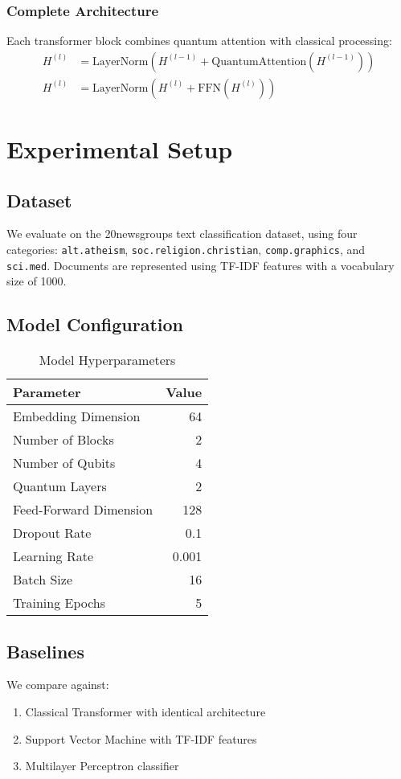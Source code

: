 \documentclass[11pt,twocolumn]{article}
\begin{document}
\subsubsection{Complete Architecture}
Each transformer block combines quantum attention with classical processing:
\begin{align}
H^{(l)} &= \text{LayerNorm}(H^{(l-1)} + \text{QuantumAttention}(H^{(l-1)}))\\
H^{(l)} &= \text{LayerNorm}(H^{(l)} + \text{FFN}(H^{(l)}))
\end{align}

\section{Experimental Setup}

\subsection{Dataset}
We evaluate on the 20newsgroups text classification dataset, using four categories: \texttt{alt.atheism}, \texttt{soc.religion.christian}, \texttt{comp.graphics}, and \texttt{sci.med}. Documents are represented using TF-IDF features with a vocabulary size of 1000.

\subsection{Model Configuration}
\begin{table}[H]
\centering
\caption{Model Hyperparameters}
\begin{tabular}{@{}lr@{}}
\toprule
Parameter & Value \\
\midrule
Embedding Dimension & 64 \\
Number of Blocks & 2 \\
Number of Qubits & 4 \\
Quantum Layers & 2 \\
Feed-Forward Dimension & 128 \\
Dropout Rate & 0.1 \\
Learning Rate & 0.001 \\
Batch Size & 16 \\
Training Epochs & 5 \\
\bottomrule
\end{tabular}
\end{table}

\subsection{Baselines}
We compare against:
\begin{enumerate}
    \item Classical Transformer with identical architecture
    \item Support Vector Machine with TF-IDF features
    \item Multilayer Perceptron classifier
\end{enumerate}
\end{document}
